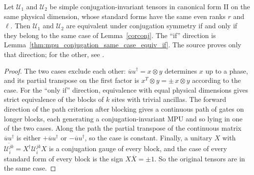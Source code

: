 \begin{lemma}
    \label{cor:equiv-under-conjugation}
    \leanok
    Let $\mathcal U_1$ and $\mathcal U_2$ be simple conjugation-invariant
    tensors in canonical form II on the same physical dimension, whose standard
    forms have the same even ranks $r$ and $\ell$. Then $\mathcal U_1$ and
    $\mathcal U_2$ are equivalent under conjugation symmetry if and only if they
    belong to the same case of Lemma~\ref{corconj}. The ``if'' direction is
    Lemma~\ref{thm:mpu_conjugation_same_case_equiv_if}. The source proves only
    that direction; for the other, see
    \cite{gap:mpu_symmetry_path_criterion_blocking}.
\end{lemma}

\begin{proof}
    \leanok
    The two cases exclude each other: $\overline uu^\dagger=x\otimes y$
    determines $x$ up to a phase, and its partial transpose on the first factor
    is $x^T\otimes y=\pm\,x\otimes y$ according to the case. For the ``only
    if'' direction, equivalence with equal physical dimensions gives strict
    equivalence of the blocks of $k$ sites with trivial ancillas. The forward
    direction of the path criterion after blocking gives a continuous path of
    gates on longer blocks, each generating a conjugation-invariant MPU and so
    lying in one of the two cases. Along the path the partial transpose of the
    continuous matrix $\overline uu^\dagger$ is either $+\overline uu^\dagger$
    or $-\overline uu^\dagger$, so the case is constant. Finally, a unitary
    $X$ with $\overline{\mathcal U_i^{jk}}=X^\dagger\mathcal U_i^{jk}X$ is a
    conjugation gauge of every block, and the case of every standard form of
    every block is the sign $X\overline X=\pm1$. So the original tensors are
    in the same case.
\end{proof}

